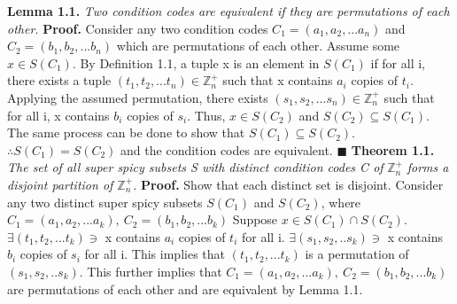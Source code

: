 \documentclass[12pt]{article}
\begin{document}
\newline
\textbf{Lemma 1.1.} \textit{Two condition codes are equivalent if they are permutations of each other.} \newline
\textbf{Proof.}
Consider any two condition codes \(C_1=(a_1,a_2,...a_n)\) and \(C_2=(b_1,b_2,...b_n)\) which are permutations of each other.
\newline
Assume some \(x \in S(C_1)\).
\newline
By Definition 1.1, a tuple x is an element in \(S(C_1)\) if for all i, there exists a tuple \((t_1,t_2,...t_n)\in \mathbb{Z}_n^+\) such that x contains \(a_i\) copies of \(t_i\). \newline
\newline
Applying the assumed permutation, there exists \((s_1,s_2,...s_n)\in \mathbb{Z}_n^+\) such that for all i, x contains \(b_i\) copies of \(s_i\).
\newline
\newline
Thus, \(x \in S(C_2)\) and \(S(C_2) \subseteq S(C_1)\).
\newline
The same process can be done to show that \(S(C_1) \subseteq S(C_2)\).
\newline
\(\therefore S(C_1) = S(C_2)\) and the condition codes are equivalent.
\newline \(\blacksquare\) \newline \newline
\textbf{Theorem 1.1.} \textit{The set of all super spicy subsets S with distinct condition codes C of} \(\mathbb{Z}_n^+\) \textit{forms a disjoint partition of \(\mathbb{Z}_n^+\).} \newline \newline
\textbf{Proof. } Show that each distinct set is disjoint. \newline
\newline
Consider any two distinct super spicy subsets \(S(C_1)\) and \(S(C_2)\),
where \newline
\(C_1=(a_1,a_2,...a_k),\ C_2=(b_1,b_2,...b_k)\)\newline
Suppose \(x\in S(C_1)\cap S(C_2)\). \newline
\(\exists (t_1,t_2,...t_k) \ni\) x contains \(a_i\) copies of \(t_i\) for all i. \newline
\(\exists (s_1,s_2,..s_k) \ni\) x contains \(b_i\) copies of \(s_i\) for all i.
\newline
This implies that \((t_1,t_2,...t_k)\) is a permutation of \((s_1,s_2,..s_k)\). \newline
This further implies that \(C_1=(a_1,a_2,...a_k),\ C_2=(b_1,b_2,...b_k)\) are permutations of each other and are equivalent by Lemma 1.1.\newline
\end{document}
